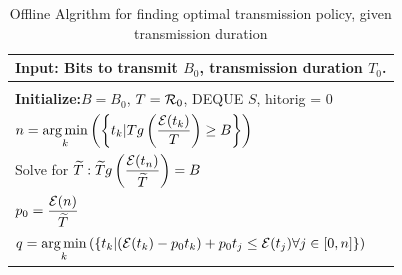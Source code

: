 \begin{table}
\begin{minipage}[b]{8cm}
\caption{Offline Algrithm for finding optimal transmission policy, given transmission duration}
\begin{tabular}{p{7cm}}
\hline \textbf{Input}: Bits to transmit $B_0$, transmission duration $T_0$.\\
\hline
\\
\textbf{Initialize:}$B = B_0$, $T = \mathcal{R}_0$, DEQUE $S$, hitorig = $0$
\\
$n=\displaystyle \operatorname*{arg\,min}_k\left(\left\{t_k | Tg\left(\frac{\mathcal{E}(t_k)}{T}\right)\geq B\right\}\right)$
\\
Solve for $\widetilde{T}: \widetilde{T}g\left(\dfrac{\mathcal{E}(t_n)}{\widetilde{T}}\right) = B$
\\
$p_0=\dfrac{\mathcal{E}(n)}{\widetilde{T}}$
\\
$q=\displaystyle \operatorname*{arg\,min}_k\left(\left\{ t_k | (\mathcal{E}(t_k) - p_0t_k) + p_0t_j \leq \mathcal{E}(t_j) \forall j\in[0,n] \right\}\right)$
\\

\end{tabular}
\end{minipage}
\end{table}
